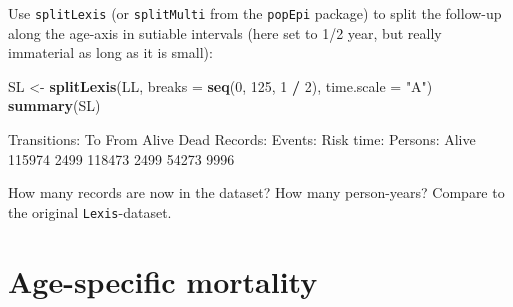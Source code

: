\documentclass[
]{book}
\newenvironment{Shaded}{\begin{snugshade}}{\end{snugshade}}
\newcommand{\AttributeTok}[1]{\textcolor[rgb]{0.13,0.29,0.53}{#1}}
\newcommand{\DecValTok}[1]{\textcolor[rgb]{0.00,0.00,0.81}{#1}}
\newcommand{\FunctionTok}[1]{\textcolor[rgb]{0.13,0.29,0.53}{\textbf{#1}}}
\newcommand{\NormalTok}[1]{#1}
\newcommand{\OtherTok}[1]{\textcolor[rgb]{0.56,0.35,0.01}{#1}}
\newcommand{\SpecialCharTok}[1]{\textcolor[rgb]{0.81,0.36,0.00}{\textbf{#1}}}
\newcommand{\StringTok}[1]{\textcolor[rgb]{0.31,0.60,0.02}{#1}}
\begin{document}
\begin{enumerate}
  Use \texttt{splitLexis} (or \texttt{splitMulti} from the
  \texttt{popEpi} package) to split the follow-up along the
  age-axis in sutiable intervals (here set to 1/2 year, but really
  immaterial as long as it is small):

\begin{Shaded}
\begin{Highlighting}[]
\NormalTok{SL }\OtherTok{\textless{}{-}} \FunctionTok{splitLexis}\NormalTok{(LL, }
                 \AttributeTok{breaks =} \FunctionTok{seq}\NormalTok{(}\DecValTok{0}\NormalTok{, }\DecValTok{125}\NormalTok{, }\DecValTok{1} \SpecialCharTok{/} \DecValTok{2}\NormalTok{), }
             \AttributeTok{time.scale =} \StringTok{"A"}\NormalTok{)}
\FunctionTok{summary}\NormalTok{(SL)}
\end{Highlighting}
\end{Shaded}

\begin{Shaded}
\begin{Highlighting}[]

\NormalTok{Transitions:}
\NormalTok{     To}
\NormalTok{From     Alive Dead  Records:  Events: Risk time:  Persons:}
\NormalTok{  Alive 115974 2499    118473     2499      54273      9996}
\end{Highlighting}
\end{Shaded}

  How many records are now in the dataset? How many person-years?
  Compare to the original \texttt{Lexis}-dataset.
\end{enumerate}

\section{Age-specific mortality}\label{age-specific-mortality}
\end{document}
